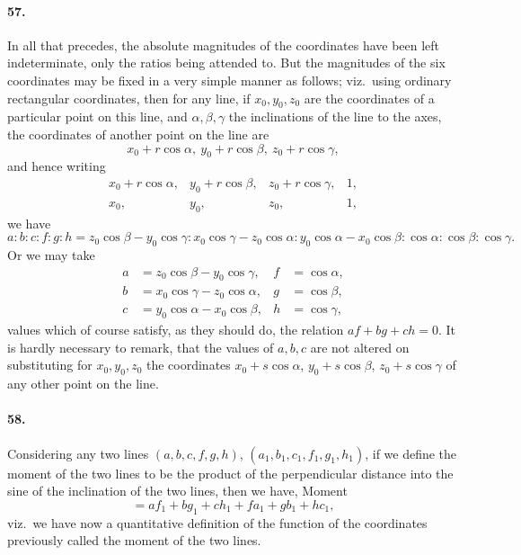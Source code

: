 \documentclass[11pt,a4paper]{article}
\begin{document}
\paragraph{57.}
In all that precedes, the absolute magnitudes of the coordinates have been
left indeterminate, only the ratios being attended to. But the magnitudes of the six
coordinates may be fixed in a very simple manner as follows; viz.\ using ordinary
rectangular coordinates, then for any line, if $x_0, y_0, z_0$ are the coordinates of a
particular point on this line, and $\alpha, \beta, \gamma$ the inclinations of the line to the
axes, the coordinates of another point on the line are
\[
x_0 + r\cos\alpha,\ y_0 + r\cos\beta,\ z_0 + r\cos\gamma,
\]
and hence writing
\[
\begin{array}{cccc}
x_0 + r\cos\alpha, & y_0 + r\cos\beta, & z_0 + r\cos\gamma, & 1, \\
x_0, & y_0, & z_0, & 1,
\end{array}
\]
we have
\[
a : b : c : f : g : h
 = z_0 \cos\beta - y_0 \cos\gamma : x_0 \cos\gamma - z_0 \cos\alpha
 : y_0 \cos\alpha - x_0 \cos\beta : \cos\alpha : \cos\beta : \cos\gamma.
\]
Or we may take
\begin{align*}
a &= z_0 \cos\beta - y_0 \cos\gamma, & f &= \cos\alpha, \\
b &= x_0 \cos\gamma - z_0 \cos\alpha, & g &= \cos\beta, \\
c &= y_0 \cos\alpha - x_0 \cos\beta, & h &= \cos\gamma,
\end{align*}
values which of course satisfy, as they should do, the relation $af + bg + ch = 0$. It is
hardly necessary to remark, that the values of $a, b, c$ are not altered on substituting
for $x_0, y_0, z_0$ the coordinates $x_0 + s \cos\alpha$, $y_0 + s\cos\beta$, $z_0 + s\cos\gamma$ of any
other point on the line.

\paragraph{58.}
Considering any two lines $(a,b,c,f,g,h)$, $(a_1, b_1, c_1, f_1, g_1, h_1)$, if we
define the moment of the two lines to be the product of the perpendicular distance into
the sine of the inclination of the two lines, then we have, Moment
\[
{} = af_1 + bg_1 + ch_1 + fa_1 + gb_1 + hc_1,
\]
viz.\ we have now a quantitative definition of the function of the coordinates previously
called the moment of the two lines.
\end{document}

